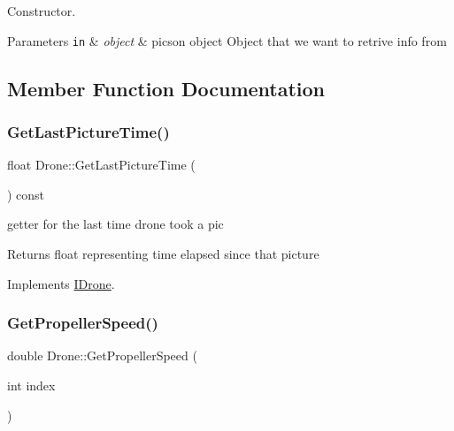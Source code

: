 Constructor. 


\begin{DoxyParams}[1]{Parameters}
\mbox{\tt in}  & {\em object} & picson object Object that we want to retrive info from \\
\hline
\end{DoxyParams}


\subsection{Member Function Documentation}
\mbox{\label{classDrone_a78de3dcbc6ae754e8874a8b65e8cd9ee}} 
\subsubsection{\texorpdfstring{Get\+Last\+Picture\+Time()}{GetLastPictureTime()}}
{\footnotesize\ttfamily float Drone\+::\+Get\+Last\+Picture\+Time (\begin{DoxyParamCaption}{ }\end{DoxyParamCaption}) const\hspace{0.3cm}{\ttfamily [virtual]}}



getter for the last time drone took a pic 

\begin{DoxyReturn}{Returns}
float representing time elapsed since that picture 
\end{DoxyReturn}


Implements \hyperlink{classIDrone_a112d19971ac7d94dba9e2f25ad667c0d}{I\+Drone}.

\mbox{\label{classDrone_a7b2fd7d3ed57cec48ebdcd09f97b83f7}} 
\subsubsection{\texorpdfstring{Get\+Propeller\+Speed()}{GetPropellerSpeed()}}
{\footnotesize\ttfamily double Drone\+::\+Get\+Propeller\+Speed (\begin{DoxyParamCaption}\item[{int}]{index }\end{DoxyParamCaption})\hspace{0.3cm}{\ttfamily [virtual]}}



